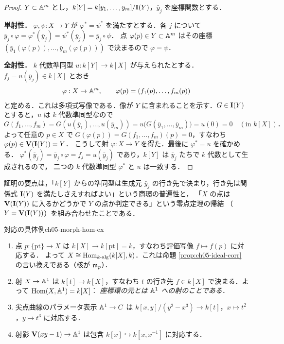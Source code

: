 \begin{proof}
$Y\subset\mathbb{A}^m$ とし，$k[Y]=k[y_1,\dots,y_m]/\mathbf{I}(Y)$，$\bar y_j$ を座標関数とする．

\textbf{単射性．} $\varphi,\psi:X\to Y$ が $\varphi^*=\psi^*$ を満たすとする．各 $j$ について
$\bar y_j\circ\varphi=\varphi^*(\bar y_j)=\psi^*(\bar y_j)=\bar y_j\circ\psi$．
点 $\varphi(p)\in Y\subset\mathbb{A}^m$ はその座標 $(\bar y_1(\varphi(p)),\dots,\bar y_m(\varphi(p)))$ で決まるので $\varphi=\psi$．

\textbf{全射性．} $k$ 代数準同型 $u:k[Y]\to k[X]$ が与えられたとする．$f_j=u(\bar y_j)\in k[X]$ とおき
\[
  \varphi:X\to\mathbb{A}^m,\qquad \varphi(p)=(f_1(p),\dots,f_m(p))
\]
と定める．これは多項式写像である．像が $Y$ に含まれることを示す．$G\in\mathbf{I}(Y)$ とすると，$u$ は $k$ 代数準同型なので
\[
  G(f_1,\dots,f_m)=G(u(\bar y_1),\dots,u(\bar y_m))=u\bigl(G(\bar y_1,\dots,\bar y_m)\bigr)=u(0)=0\quad(\text{in }k[X])．
\]
よって任意の $p\in X$ で $G(\varphi(p))=G(f_1,\dots,f_m)(p)=0$，すなわち $\varphi(p)\in\mathbf{V}(\mathbf{I}(Y))=Y$．
こうして射 $\varphi:X\to Y$ を得た．最後に $\varphi^*=u$ を確かめる．
$\varphi^*(\bar y_j)=\bar y_j\circ\varphi=f_j=u(\bar y_j)$ であり，$k[Y]$ は $\bar y_j$ たちで $k$ 代数として生成されるので，
二つの $k$ 代数準同型 $\varphi^*$ と $u$ は一致する．
\end{proof}

証明の要点は，「$k[Y]$ からの準同型は生成元 $\bar y_j$ の行き先で決まり，行き先は関係式 $\mathbf{I}(Y)$ を満たしさえすればよい」という商環の普遍性と，
「$X$ の点は $\mathbf{V}(\mathbf{I}(Y))$ に入るかどうかで $Y$ の点か判定できる」という零点定理の帰結
（$Y=\mathbf{V}(\mathbf{I}(Y))$）を組み合わせたことである．

\begin{myex}{対応の具体例}{ch05-morph-hom-ex}
\begin{enumerate}
  \item 点 $p:\{\mathrm{pt}\}\to X$ は $k[X]\to k[\mathrm{pt}]=k$，すなわち評価写像 $f\mapsto f(p)$ に対応する．
        よって $X\cong \operatorname{Hom}_{k\text{-alg}}(k[X],k)$．これは命題 \ref{prop:ch05-ideal-corr} の言い換えである（核が $\mathfrak{m}_p$）．
  \item 射 $X\to\mathbb{A}^1$ は $k[t]\to k[X]$，すなわち $t$ の行き先 $f\in k[X]$ で決まる．よって $\operatorname{Hom}(X,\mathbb{A}^1)=k[X]$：
        \emph{座標環の元とは $\mathbb{A}^1$ への射のことである．}
  \item 尖点曲線のパラメータ表示 $\mathbb{A}^1\to C$ は $k[x,y]/(y^2-x^3)\to k[t]$，$x\mapsto t^2$，$y\mapsto t^3$ に対応する．
  \item 射影 $\mathbf{V}(xy-1)\to\mathbb{A}^1$ は包含 $k[x]\hookrightarrow k[x,x^{-1}]$ に対応する．
\end{enumerate}
\end{myex}

